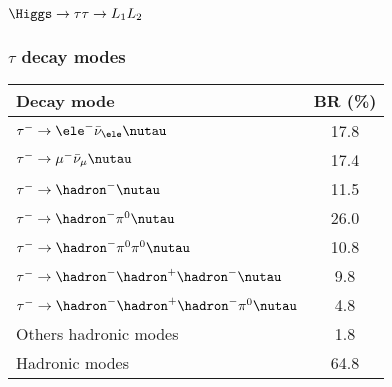 \begin{frame}
\frametitle{$\Higgs\to\tau\tau\to L_1L_2$}
\begin{center}

\end{center}
\end{frame}

\begin{frame}
\frametitle{$\tau$ decay modes}%
\begin{center}
\begin{tabular}{lc}
\toprule
Decay mode & BR (\%)\\
\midrule
$\tau^-\to \ele^-\bar{\nu}_\ele\nutau$ & \num{17.8} \\
$\tau^-\to \mu^-\bar{\nu}_\mu\nutau$ & \num{17.4} \\
\midrule
$\tau^-\to \hadron^- \nutau$ & \num{11.5} \\
$\tau^-\to \hadron^- \pi^0 \nutau$ & \num{26.0} \\
$\tau^-\to \hadron^- \pi^0\pi^0 \nutau$ & \num{10.8} \\
$\tau^-\to \hadron^- \hadron^+\hadron^- \nutau$ & \num{9.8} \\
$\tau^-\to \hadron^- \hadron^+\hadron^-\pi^0\nutau$ & \num{4.8} \\
Others hadronic modes & \num{1.8} \\
Hadronic modes & \num{64.8} \\
\bottomrule
\end{tabular}
\end{center}
\end{frame}

